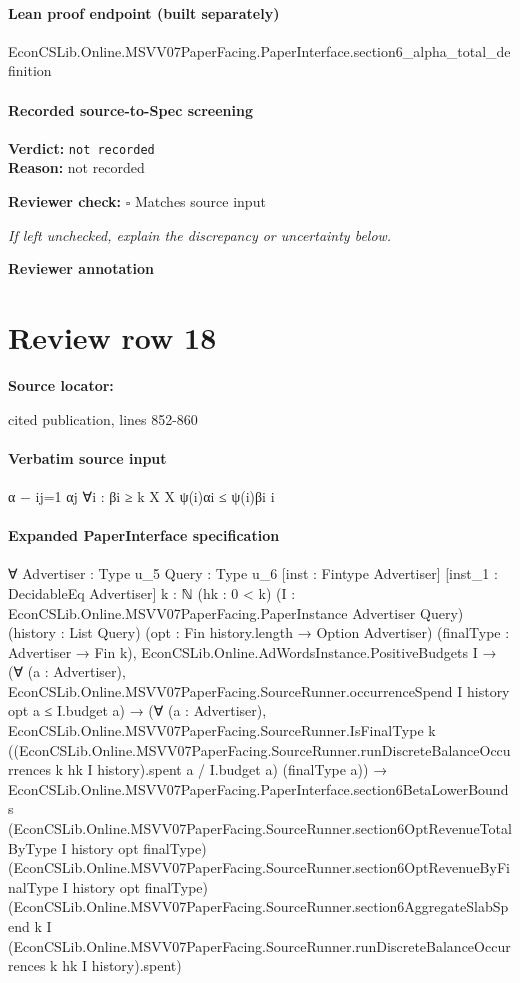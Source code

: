 \documentclass[10pt]{article}
\newcommand{\reviewerbox}{%
  \par\noindent\fbox{\parbox{0.96\linewidth}{\rule{0pt}{0.38in}}}\par
}
\newcommand{\reviewmatch}[1]{%
  \par\noindent\textbf{Reviewer check:} $\square$\; #1\par
  \noindent\emph{If left unchecked, explain the discrepancy or uncertainty below.}\par
}
\begin{document}
\paragraph{Lean proof endpoint (built separately)}\begin{ReviewVerbatim}
EconCSLib.Online.MSVV07PaperFacing.PaperInterface.section6_alpha_total_definition
\end{ReviewVerbatim}

\paragraph{Recorded source-to-Spec screening}
\textbf{Verdict:} \texttt{not recorded}
\\
\textbf{Reason:} not recorded
\reviewmatch{Matches source input}
\noindent\textbf{Reviewer annotation}\par
\reviewerbox
\clearpage
\hypertarget{source-claim-eebe44ff8b8096af}{}
\section*{Review row 18}
\textbf{Source locator:} {\footnotesize\raggedright cited publication, lines 852-\allowbreak{}860\par}
\paragraph{Verbatim source input}
\begin{ReviewVerbatim}
α − ij=1 αj
∀i : βi ≥
k
X
X
ψ(i)αi ≤
ψ(i)βi
i
\end{ReviewVerbatim}


\paragraph{Expanded PaperInterface specification}
\begin{ReviewVerbatim}
∀ {Advertiser : Type u_5} {Query : Type u_6} [inst : Fintype Advertiser] [inst_1 : DecidableEq Advertiser] {k : ℕ}
  (hk : 0 < k) (I : EconCSLib.Online.MSVV07PaperFacing.PaperInstance Advertiser Query) (history : List Query)
  (opt : Fin history.length → Option Advertiser) (finalType : Advertiser → Fin k),
  EconCSLib.Online.AdWordsInstance.PositiveBudgets I →
    (∀ (a : Advertiser), EconCSLib.Online.MSVV07PaperFacing.SourceRunner.occurrenceSpend I history opt a ≤ I.budget a) →
      (∀ (a : Advertiser),
          EconCSLib.Online.MSVV07PaperFacing.SourceRunner.IsFinalType k
            ((EconCSLib.Online.MSVV07PaperFacing.SourceRunner.runDiscreteBalanceOccurrences k hk I history).spent a /
              I.budget a)
            (finalType a)) →
        EconCSLib.Online.MSVV07PaperFacing.PaperInterface.section6BetaLowerBounds
          (EconCSLib.Online.MSVV07PaperFacing.SourceRunner.section6OptRevenueTotalByType I history opt finalType)
          (EconCSLib.Online.MSVV07PaperFacing.SourceRunner.section6OptRevenueByFinalType I history opt finalType)
          (EconCSLib.Online.MSVV07PaperFacing.SourceRunner.section6AggregateSlabSpend k I
            (EconCSLib.Online.MSVV07PaperFacing.SourceRunner.runDiscreteBalanceOccurrences k hk I history).spent)
\end{ReviewVerbatim}
\end{document}
